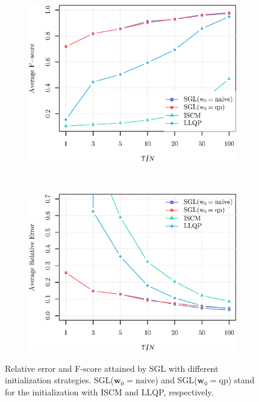 \begin{figure}[!htb]
    \centering
    \begin{subfigure}[b]{0.45\textwidth}
      \includegraphics[width=\textwidth]{initial_guess/latex/figures/fscore.eps}
    \end{subfigure}
    ~ %
    \begin{subfigure}[b]{0.45\textwidth}
        \includegraphics[width=\textwidth]{initial_guess/latex/figures/relative_error.eps}
    \end{subfigure}
    \caption{Relative error and F-score attained by \textsf{SGL} with different initialization strategies.
             \textsf{SGL}($\mathbf{w}_0 = \text{naive}$) and \textsf{SGL}($\mathbf{w}_0 = \text{qp}$)
           stand for the initialization with \textsf{ISCM} and \textsf{LLQP}, respectively.}
    \label{fig:initial-guess}
\end{figure}
